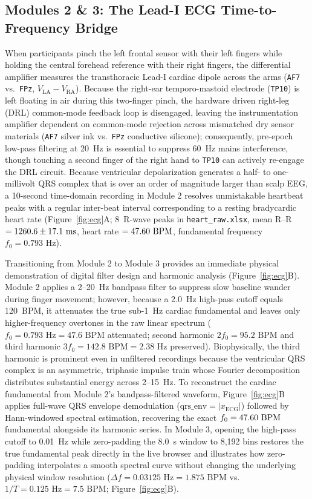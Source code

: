 \documentclass[11pt,letterpaper]{article}
\providecommand{\ECGNPeaks}{8}
\providecommand{\ECGDomFreqHz}{0.793}
\providecommand{\ECGHarmonicTwoBPM}{95.2}
\providecommand{\ECGHarmonicThreeBPM}{142.8}
\begin{document}
\subsection{Modules 2 \& 3: The Lead-I ECG Time-to-Frequency Bridge}
When participants pinch the left frontal sensor with their left fingers while holding the central forehead reference with their right fingers, the differential amplifier measures the transthoracic Lead-I cardiac dipole across the arms (\texttt{AF7} vs.\ \texttt{FPz}, $V_{\text{LA}} - V_{\text{RA}}$). Because the right-ear temporo-mastoid electrode (\texttt{TP10}) is left floating in air during this two-finger pinch, the hardware driven right-leg (DRL) common-mode feedback loop is disengaged, leaving the instrumentation amplifier dependent on common-mode rejection across mismatched dry sensor materials (\texttt{AF7} silver ink vs.\ \texttt{FPz} conductive silicone); consequently, pre-epoch low-pass filtering at 20~Hz is essential to suppress 60~Hz mains interference, though touching a second finger of the right hand to \texttt{TP10} can actively re-engage the DRL circuit. Because ventricular depolarization generates a half- to one-millivolt QRS complex that is over an order of magnitude larger than scalp EEG, a 10-second time-domain recording in Module 2 resolves unmistakable heartbeat peaks with a regular inter-beat interval corresponding to a resting bradycardic heart rate (Figure~\ref{fig:ecg}A; \ECGNPeaks\ R-wave peaks in \texttt{heart\_raw.xlsx}, mean R--R $= 1260.6 \pm 17.1\text{ ms}$, heart rate $= 47.60\text{ BPM}$, fundamental frequency $f_0 = \ECGDomFreqHz\text{ Hz}$).

Transitioning from Module 2 to Module 3 provides an immediate physical demonstration of digital filter design and harmonic analysis (Figure~\ref{fig:ecg}B). Module 2 applies a 2--20~Hz bandpass filter to suppress slow baseline wander during finger movement; however, because a 2.0~Hz high-pass cutoff equals 120~BPM, it attenuates the true sub-1~Hz cardiac fundamental and leaves only higher-frequency overtones in the raw linear spectrum ($f_0 = \ECGDomFreqHz\text{ Hz} = 47.6\text{ BPM}$ attenuated; second harmonic $2f_0 = \ECGHarmonicTwoBPM\text{ BPM}$ and third harmonic $3f_0 = \ECGHarmonicThreeBPM\text{ BPM} = 2.38\text{ Hz}$ preserved). Biophysically, the third harmonic is prominent even in unfiltered recordings because the ventricular QRS complex is an asymmetric, triphasic impulse train whose Fourier decomposition distributes substantial energy across 2--15~Hz. To reconstruct the cardiac fundamental from Module 2's bandpass-filtered waveform, Figure~\ref{fig:ecg}B applies full-wave QRS envelope demodulation ($\text{qrs\_env} = |x_{\text{ECG}}|$) followed by Hann-windowed spectral estimation, recovering the exact $f_0 = 47.60\text{ BPM}$ fundamental alongside its harmonic series. In Module 3, opening the high-pass cutoff to 0.01~Hz while zero-padding the 8.0~s window to 8,192 bins restores the true fundamental peak directly in the live browser and illustrates how zero-padding interpolates a smooth spectral curve without changing the underlying physical window resolution ($\Delta f = 0.03125\text{ Hz} = 1.875\text{ BPM}$ vs.\ $1/T = 0.125\text{ Hz} = 7.5\text{ BPM}$; Figure~\ref{fig:ecg}B).
\end{document}
